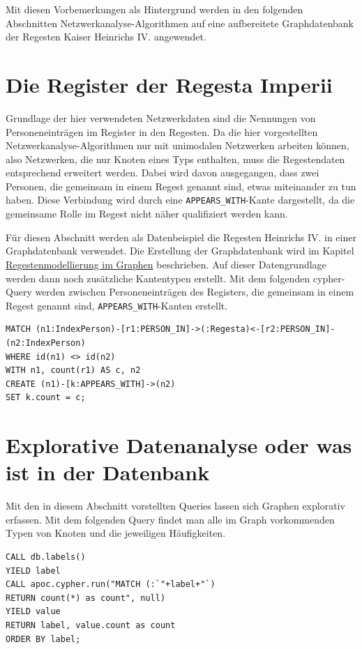 \documentclass[ngerman,]{scrreprt}
\begin{document}
Mit diesen Vorbemerkungen als Hintergrund werden in den folgenden Abschnitten Netzwerkanalyse-Algorithmen auf eine aufbereitete Graphdatenbank der Regesten Kaiser Heinrichs IV. angewendet.

\section{Die Register der Regesta Imperii}\label{die-register-der-regesta-imperii}

Grundlage der hier verwendeten Netzwerkdaten sind die Nennungen von Personeneinträgen im Register in den Regesten. Da die hier vorgestellten Netzwerkanalyse-Algorithmen nur mit unimodalen Netzwerken arbeiten können, also Netzwerken, die nur Knoten eines Typs enthalten, muss die Regestendaten entsprechend erweitert werden. Dabei wird davon ausgegangen, dass zwei Personen, die gemeinsam in einem Regest genannt sind, etwas miteinander zu tun haben. Diese Verbindung wird durch eine \texttt{APPEARS\_WITH}-Kante dargestellt, da die gemeinsame Rolle im Regest nicht näher qualifiziert werden kann.

Für diesen Abschnitt werden als Datenbeispiel die Regesten Heinrichs IV. in einer Graphdatenbank verwendet. Die Erstellung der Graphdatenbank wird im Kapitel \href{20_Regestenmodellierung-im-Graphen.md}{Regestenmodellierung im Graphen} beschrieben. Auf dieser Datengrundlage werden dann noch zusätzliche Kantentypen erstellt. Mit dem folgenden cypher-Query werden zwischen Personeneinträgen des Registers, die gemeinsam in einem Regest genannt sind, \texttt{APPEARS\_WITH}-Kanten erstellt.

\begin{verbatim}
MATCH (n1:IndexPerson)-[r1:PERSON_IN]->(:Regesta)<-[r2:PERSON_IN]-(n2:IndexPerson)
WHERE id(n1) <> id(n2)
WITH n1, count(r1) AS c, n2
CREATE (n1)-[k:APPEARS_WITH]->(n2)
SET k.count = c;
\end{verbatim}

\section{Explorative Datenanalyse oder was ist in der Datenbank}\label{explorative-datenanalyse-oder-was-ist-in-der-datenbank}

Mit den in diesem Abschnitt vorstellten Queries lassen sich Graphen explorativ erfassen. Mit dem folgenden Query findet man alle im Graph vorkommenden Typen von Knoten und die jeweiligen Häufigkeiten.

\begin{verbatim}
CALL db.labels()
YIELD label
CALL apoc.cypher.run("MATCH (:`"+label+"`)
RETURN count(*) as count", null)
YIELD value
RETURN label, value.count as count
ORDER BY label;
\end{verbatim}
\end{document}
